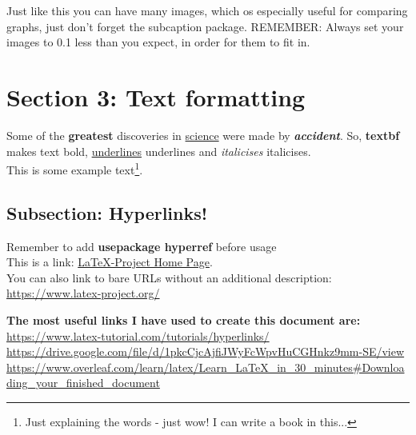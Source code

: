 \documentclass{article}
\begin{document}
Just like this you can have many images, which os especially useful for comparing graphs, just don't forget the subcaption package. REMEMBER: Always set your images to 0.1 less than you expect, in order for them to fit in.

\section{Section 3: Text formatting}
Some of the \textbf{greatest}
discoveries in \underline{science} 
were made by \textbf{\textit{accident}}.
\newline
So, \textbf{textbf} makes text bold, \underline{underlines} underlines and \textit{italicises} italicises.\\

This is some example text\footnote{\label{myfootnote}Just explaining the words - just wow! I can write a book in this...}.

\subsection{Subsection: Hyperlinks!}
Remember to add \textbf{usepackage {hyperref}} before usage\\
This is a link: \href{https://www.latex-project.org/}{LaTeX-Project Home Page}.\\
You can also link to bare URLs without an additional description:\\ \url{https://www.latex-project.org/}\\

\vspace{10px}

\textbf{The most useful links I have used to create this document are:} \\ 
\url{https://www.latex-tutorial.com/tutorials/hyperlinks/}\\
\url{https://drive.google.com/file/d/1pkcCjcAjfiJWyFcWpvHuCGHnkz9mm-SE/view}\\
\url{https://www.overleaf.com/learn/latex/Learn_LaTeX_in_30_minutes#Downloading_your_finished_document}
\end{document}

